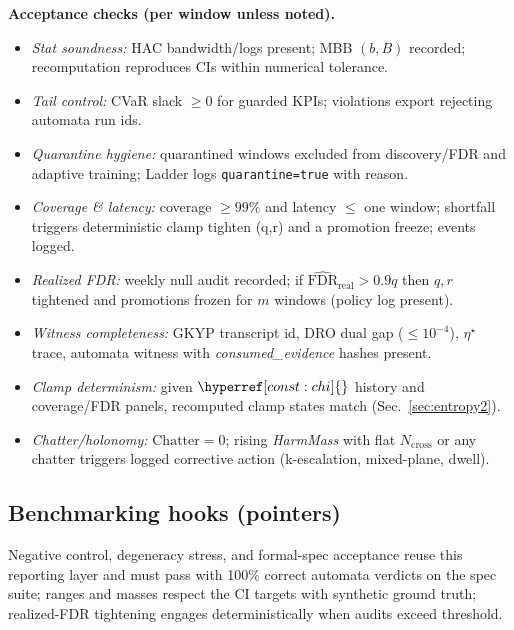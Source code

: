\documentclass[10pt]{article}
\newcommand{\cutq}{q}
\newcommand{\constref}[1]{\hyperref[const:#1]{\ensuremath{\csname constsym#1\endcsname}}}
\begin{document}
\begin{mdframed}
\textbf{Acceptance checks (per window unless noted).}
\begin{itemize}[leftmargin=*]
\item \emph{Stat soundness:} HAC bandwidth/logs present; MBB $(b,B)$ recorded; recomputation reproduces CIs within numerical tolerance.
\item \emph{Tail control:} CVaR slack $\ge 0$ for guarded KPIs; violations export rejecting automata run ids.
\item \emph{Quarantine hygiene:} quarantined windows excluded from discovery/FDR and adaptive training; Ladder logs \texttt{quarantine=true} with reason.
\item \emph{Coverage \& latency:} coverage $\ge 99\%$ and latency $\le$ one window; shortfall triggers deterministic clamp tighten (q,r) and a promotion freeze; events logged.
\item \emph{Realized FDR:} weekly null audit recorded; if $\widehat{\mathrm{FDR}}_{\mathrm{real}}>0.9\cutq$ then $q,r$ tightened and promotions frozen for $m$ windows (policy log present).
\item \emph{Witness completeness:} GKYP transcript id, DRO dual gap ($\le 10^{-4}$), $\eta^\star$ trace, automata witness with \emph{consumed\_evidence} hashes present.
\item \emph{Clamp determinism:} given $\constref{chi}$ history and coverage/FDR panels, recomputed clamp states match (Sec.~\ref{sec:entropy2}).
\item \emph{Chatter/holonomy:} $\mathrm{Chatter}=0$; rising \emph{HarmMass} with flat $N_{\mathrm{cross}}$ or any chatter triggers logged corrective action (k-escalation, mixed-plane, dwell).
\end{itemize}
\end{mdframed}

\subsection*{Benchmarking hooks (pointers)}
Negative control, degeneracy stress, and formal-spec acceptance reuse this reporting layer and must pass with 100\% correct automata verdicts on the spec suite; ranges and masses respect the CI targets with synthetic ground truth; realized-FDR tightening engages deterministically when audits exceed threshold.
\end{document}
